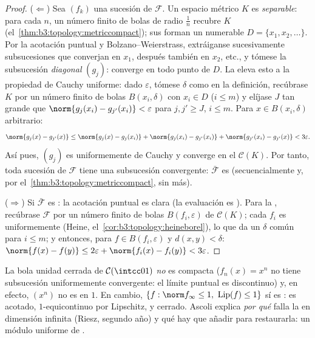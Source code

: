 \begin{proof}
($\Leftarrow$) Sea $(f_k)$ una sucesión de $\mathcal F$. Un espacio
métrico $K$  es
\emph{separable}: para cada $n$, un número finito de bolas de radio
$\frac1n$ recubre $K$ (el~\cref{thm:b3:topology:metriccompact}); sus
 forman un
 numerable
$D = \{x_1, x_2, \dots\}$. Por la acotación puntual y
Bolzano--Weierstrass, extráiganse sucesivamente subsucesiones que
converjan en $x_1$, después también en $x_2$, etc., y tómese la
subsucesión \emph{diagonal} $(g_j)$: converge en todo punto de $D$. La
 eleva esto a la
propiedad de Cauchy uniforme: dado $\varepsilon$, tómese $\delta$ como
en la definición, recúbrase $K$ por un número finito de bolas
$B(x_i, \delta)$ con $x_i \in D$ ($i \leq m$) y elíjase $J$ tan grande
que $\norm{g_j(x_i) - g_{j'}(x_i)} < \varepsilon$ para $j, j' \geq
J$, $i \leq m$. Para $x \in B(x_i, \delta)$ arbitrario:
\[
\norm{g_j(x) - g_{j'}(x)}
\leq \norm{g_j(x) - g_j(x_i)} + \norm{g_j(x_i) - g_{j'}(x_i)}
+ \norm{g_{j'}(x_i) - g_{j'}(x)} < 3\varepsilon .
\]
Así pues, $(g_j)$ es uniformemente de Cauchy y converge en el
 $\mathcal C(K)$. Por tanto,
toda sucesión de $\mathcal F$ tiene una subsucesión convergente:
$\bar{\mathcal F}$ es 
(secuencialmente y, por el~\cref{thm:b3:topology:metriccompact}, sin
más).

($\Rightarrow$) Si $\bar{\mathcal F}$ es
: la acotación puntual es
clara (la evaluación es ).
Para la ,
recúbrase $\mathcal F$ por un número finito de bolas
$B(f_i, \varepsilon)$ de $\mathcal C(K)$; cada $f_i$ es uniformemente
 (Heine,
el~\cref{cor:b3:topology:heineborel}), lo que da un $\delta$ común para
$i \leq m$; y entonces, para $f \in B(f_i, \varepsilon)$ y $d(x,y)
< \delta$: $\norm{f(x)-f(y)} \leq 2\varepsilon +
\norm{f_i(x)-f_i(y)} < 3\varepsilon$.
\end{proof}

\begin{example}\label{ex:b3:complete:ascoliexamples}
La bola unidad cerrada de $\mathcal C(\intcc01)$ \emph{no} es
compacta ($f_n(x) = x^n$ no tiene
subsucesión uniformemente convergente: el límite puntual es discontinuo)
y, en efecto, $(x^n)$ no es
 en $1$. En cambio,
$\{f : \norm
f_\infty \leq 1,\ \operatorname{Lip}(f) \leq 1\}$ sí es
: es acotado, $1$-equicontinuo
por Lipschitz, y cerrado. Ascoli explica \emph{por qué} falla la
 en dimensión infinita (Riesz, segundo año) y qué hay que
añadir para restaurarla: un módulo uniforme de
.
\end{example}

